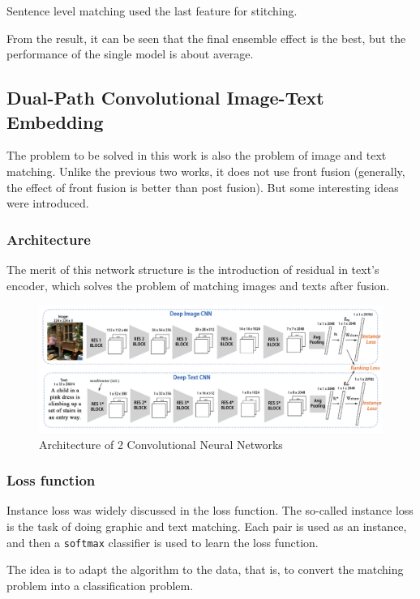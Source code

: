 Sentence level matching used the last feature for stitching.

From the result, it can be seen that the final ensemble effect is the best, but the performance of the single model is about average.

\subsection{Dual-Path Convolutional Image-Text Embedding}

The problem to be solved in this work \cite{zheng2017dualpath} is also the problem of image and text matching. Unlike the previous two works, it does not use front fusion (generally, the effect of front fusion is better than post fusion). But some interesting ideas were introduced.

\subsubsection{Architecture}
The merit of this network structure is the introduction of residual in text's encoder, which solves the problem of matching images and texts after fusion.

\begin{figure}[h!]
\centering
\includegraphics[width=\textwidth]{dpcit1.pdf}
\caption{Architecture of 2 Convolutional Neural Networks \cite{zheng2017dualpath}}
\label{fig:dpcit1}
\end{figure}

\subsubsection{Loss function}
Instance loss was widely discussed in the loss function. The so-called instance loss is the task of doing graphic and text matching. Each pair is used as an instance, and then a \verb|softmax| classifier is used to learn the loss function.

The idea is to adapt the algorithm to the data, that is, to convert the matching problem into a classification problem.

